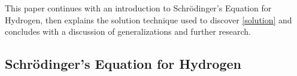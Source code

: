 \documentclass{article}
\begin{document}

This paper continues with an introduction to Schr\"odinger's Equation for Hydrogen,
then explains the solution technique used to discover \eqref{solution}
and concludes with a discussion of generalizations and further research.


\subsection*{Schr\"odinger's Equation for Hydrogen}

\end{document}
